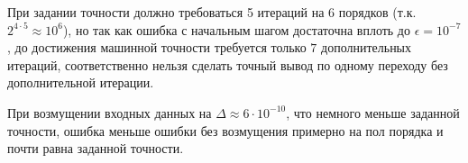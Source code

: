 \documentclass[a4paper]{article}
\begin{document}
При задании точности должно требоваться 5 итераций на 6 порядков (т.к. \(2^{4\cdot5} \approx 10^{6}\)), но так как ошибка с
начальным шагом достаточна вплоть до \(\epsilon = 10^{-7}\), до достижения машинной точности требуется только \(7\)
дополнительных итераций, соответственно нельзя сделать точный вывод по одному переходу без дополнительной итерации.

При возмущении входных данных на \(\Delta \approx 6\cdot10^{-10}\), что немного меньше заданной точности, ошибка меньше ошибки без
возмущения примерно на пол порядка и почти равна заданной точности.
\end{document}
